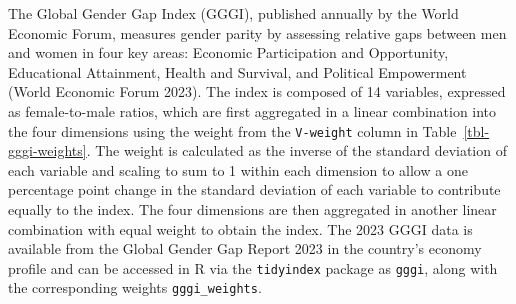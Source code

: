\documentclass[
]{interact}
\begin{document}
The Global Gender Gap Index (GGGI), published annually by the World
Economic Forum, measures gender parity by assessing relative gaps
between men and women in four key areas: Economic Participation and
Opportunity, Educational Attainment, Health and Survival, and Political
Empowerment (World Economic Forum 2023). The index is composed of 14
variables, expressed as female-to-male ratios, which are first
aggregated in a linear combination into the four dimensions using the
weight from the \texttt{V-weight} column in
Table~\ref{tbl-gggi-weights}. The weight is calculated as the inverse of
the standard deviation of each variable and scaling to sum to 1 within
each dimension to allow a one percentage point change in the standard
deviation of each variable to contribute equally to the index. The four
dimensions are then aggregated in another linear combination with equal
weight to obtain the index. The 2023 GGGI data is available from the
Global Gender Gap Report 2023 in the country's economy profile and can
be accessed in R via the \texttt{tidyindex} package as \texttt{gggi},
along with the corresponding weights \texttt{gggi\_weights}.
\end{document}
